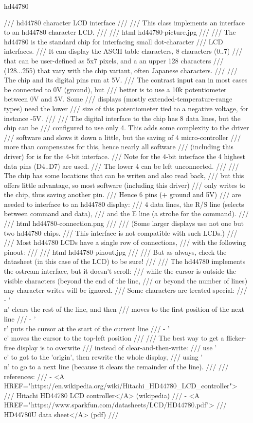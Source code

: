 hd44780

/// hd44780 character LCD interface
///
/// This class implements an interface to an hd44780 character LCD.
///
/// \image html hd44780-picture.jpg
///
/// The hd44780 is the standard chip for interfacing small dot-character
/// LCD interfaces.
/// It can display the ASCII table characters, 8 characters (0..7)
/// that can be user-defined as 5x7 pixels, and a an upper 128 characters
/// (128...255) that vary with the chip variant, often Japanese characters.
///
/// The chip and its digital pins run at 5V.
/// The contrast input can in most cases be connected to 0V (ground), but
/// better is to use a 10k potentiometer between 0V and 5V. Some
/// displays (mostly extended-temperature-range types) need the lower
/// size of this potentiometer tied to a negative voltage, for instance -5V.
///
/// The digital interface to the chip has 8 data lines, but the chip can be
/// configured to use only 4. This adds some complexity to the driver
/// software and slows it down a little, but the saving of 4 micro-controller
/// more than compensates for this, hence nearly all software
/// (including this driver) for is for the 4-bit interface.
/// Note for the 4-bit interface the 4 highest data pins (D4..D7) are used.
/// The lower 4 can be left unconnected.
///
/// The chip has some locations that can be writen and also read back,
/// but this offers little advantage, so most software (including this driver)
/// only writes to the chip, thus saving another pin.
/// Hence 6 pins (+ ground and 5V)
/// are needed to interface to an hd44780 display:
/// 4 data lines, the R/S line (selects between command and data),
/// and the E line (a strobe for the command).
///
/// \image html hd44780-connection.png
///
/// (Some larger displays use not one but two hd44780 chips.
/// This interface is not compatible with such LCDs.)
///
/// Most hd44780 LCDs have a single row of connections,
/// with the following pinout:
///
/// \image html hd44780-pinout.jpg
///
/// But as always, check the datasheet (in this case of the LCD) to be sure!
///
/// The hd44780 implements the ostream interface, but it doesn't scroll:
/// while the cursor is outside the visible characters (beyond the end of the line,
/// or beyond the number of lines) any character writes will be ignored.
/// Some characters are treated special:
///    - '\\n' clears the rest of the line, and then
///      moves to the first position of the next line
///    - '\\r' puts the cursor at the start of the current line
///    - '\\c' moves the cursor to the top-left position
///
/// The best way to get a flicker-free display is to overwite
/// instead of clear-and-then-write:
/// use '\\c' to got to the 'origin', then rewrite the whole display,
/// using '\\n' to go to a next line (because it clears the remainder of the line).
///
/// references:
///    - <A HREF="https://en.wikipedia.org/wiki/Hitachi_HD44780_LCD_controller">
///       Hitachi HD44780 LCD controller</A> (wikipedia)
///    - <A HREF="https://www.sparkfun.com/datasheets/LCD/HD44780.pdf">
///       HD44780U data sheet</A> (pdf)
///

